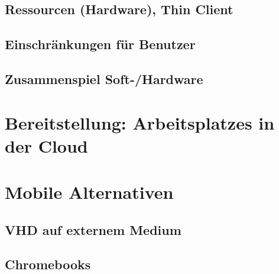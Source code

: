 \subsection{Ressourcen (Hardware), Thin Client}

\subsection{Einschränkungen für Benutzer}

\subsection{Zusammenspiel Soft-/Hardware}





\section{Bereitstellung: Arbeitsplatzes in der Cloud}


\section{Mobile Alternativen}

\subsection{VHD auf externem Medium}

\subsection{Chromebooks}

